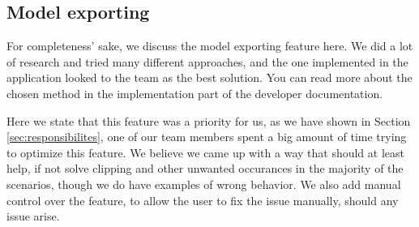 \subsection{Model exporting}

For completeness' sake, we discuss the model exporting feature here. We did a lot of research and tried many different approaches, and the one implemented in the application looked to the team as the best solution. You can read more about the chosen method in the implementation part of the developer documentation.

Here we state that this feature was a priority for us, as we have shown in Section \ref{sec:responsibilites}, one of our team members spent a big amount of time trying to optimize this feature. We believe we came up with a way that should at least help, if not solve clipping and other unwanted occurances in the majority of the scenarios, though we do have examples of wrong behavior. We also add manual control over the feature, to allow the user to fix the issue manually, should any issue arise.




